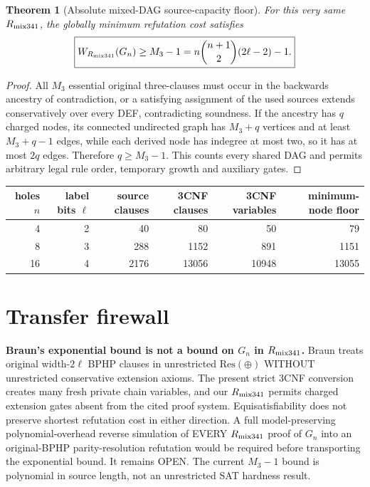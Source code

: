 \documentclass[11pt]{article}
\newtheorem{theorem}{Theorem}
\begin{document}
\begin{theorem}[Absolute mixed-DAG source-capacity floor]
For this very same $R_{\rm mix341}$, the globally minimum refutation cost satisfies
\[
\boxed{W_{R_{\rm mix341}}(G_n)\ge M_3-1
=n\binom{n+1}2(2\ell-2)-1.}
\]
\end{theorem}
\begin{proof}
All $M_3$ essential original three-clauses must occur in the backwards ancestry of contradiction, or a satisfying assignment of the used sources extends conservatively over every DEF, contradicting soundness. If the ancestry has $q$ charged nodes, its connected undirected graph has $M_3+q$ vertices and at least $M_3+q-1$ edges, while each derived node has indegree at most two, so it has at most $2q$ edges. Therefore $q\ge M_3-1$. This counts every shared DAG and permits arbitrary legal rule order, temporary growth and auxiliary gates.
\end{proof}

\begin{center}\begin{tabular}{rrrrrr}\toprule
holes $n$&label bits $\ell$&source clauses&3CNF clauses&3CNF variables&minimum-node floor\\\midrule
4&2&40&80&50&79\\
8&3&288&1152&891&1151\\
16&4&2176&13056&10948&13055\\
\bottomrule\end{tabular}\end{center}

\section{Transfer firewall}
\textbf{Braun's exponential bound is not a bound on $G_n$ in $R_{\rm mix341}$.} Braun treats original width-$2\ell$ BPHP clauses in unrestricted $\mathrm{Res}(\oplus)$ WITHOUT unrestricted conservative extension axioms. The present strict 3CNF conversion creates many fresh private chain variables, and our $R_{\rm mix341}$ permits charged extension gates absent from the cited proof system. Equisatisfiability does not preserve shortest refutation cost in either direction. A full model-preserving polynomial-overhead reverse simulation of EVERY $R_{\rm mix341}$ proof of $G_n$ into an original-BPHP parity-resolution refutation would be required before transporting the exponential bound. It remains OPEN. The current $M_3-1$ bound is polynomial in source length, not an unrestricted SAT hardness result.
\end{document}
